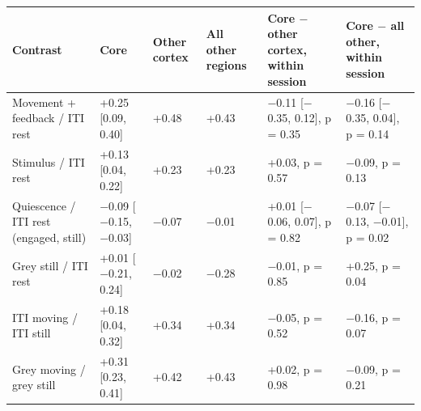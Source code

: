 \documentclass[10pt,a4paper]{article}
\begin{document}
{\small\renewcommand{\arraystretch}{1.2}
\begin{xltabular}{\linewidth}{>{\hsize\raggedright\arraybackslash}X>{\hsize\raggedleft\arraybackslash}X>{\hsize\raggedleft\arraybackslash}X>{\hsize\raggedleft\arraybackslash}X>{\hsize\raggedright\arraybackslash}X>{\hsize\raggedright\arraybackslash}X}
\toprule
\textbf{Contrast} & \textbf{Core} & \textbf{Other cortex} & \textbf{All other regions} & \textbf{Core $-$ other cortex, within session} & \textbf{Core $-$ all other, within session} \\
\midrule
\endhead
Movement + feedback / ITI rest & +0.25 [0.09, 0.40] & +0.48 & +0.43 & $-$0.11 [$-$0.35, 0.12], p = 0.35 & $-$0.16 [$-$0.35, 0.04], p = 0.14 \\
Stimulus / ITI rest & +0.13 [0.04, 0.22] & +0.23 & +0.23 & +0.03, p = 0.57 & $-$0.09, p = 0.13 \\
Quiescence / ITI rest (engaged, still) & $-$0.09 [$-$0.15, $-$0.03] & $-$0.07 & $-$0.01 & +0.01 [$-$0.06, 0.07], p = 0.82 & $-$0.07 [$-$0.13, $-$0.01], p = 0.02 \\
Grey still / ITI rest & +0.01 [$-$0.21, 0.24] & $-$0.02 & $-$0.28 & $-$0.01, p = 0.85 & +0.25, p = 0.04 \\
ITI moving / ITI still & +0.18 [0.04, 0.32] & +0.34 & +0.34 & $-$0.05, p = 0.52 & $-$0.16, p = 0.07 \\
Grey moving / grey still & +0.31 [0.23, 0.41] & +0.42 & +0.43 & +0.02, p = 0.98 & $-$0.09, p = 0.21 \\
\bottomrule
\end{xltabular}}
\end{document}
